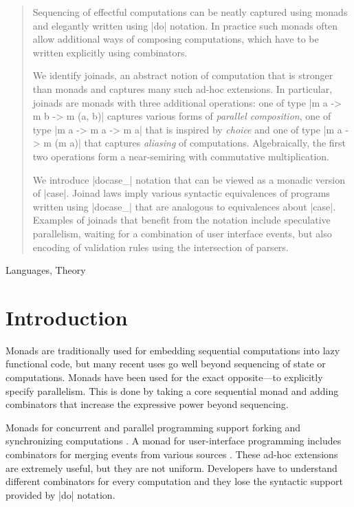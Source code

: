 \documentclass{sigplanconf}
\begin{document}
\begin{abstract}
Sequencing of effectful computations can be neatly captured using monads and elegantly written using 
|do| notation. In practice such monads often allow additional ways of composing computations, 
which have to be written explicitly using combinators.

We identify joinads, an abstract notion of computation that is stronger than monads and captures
many such ad-hoc extensions. In particular, joinads are monads with three additional operations: 
one of type |m a -> m b -> m (a, b)| captures various forms of \textit{parallel composition}, 
one of type |m a -> m a -> m a| that is inspired by \textit{choice} and one of type |m a -> m (m a)| 
that captures \textit{aliasing} of computations. Algebraically, the first two operations form a 
near-semiring with commutative multiplication.

We introduce |docase_| notation that can be viewed as a monadic version of |case|. Joinad laws
imply various syntactic equivalences of programs written using |docase_| 
that are analogous to equivalences about |case|. Examples of joinads that benefit from the notation
include speculative parallelism, waiting for a combination of user interface events, but also 
encoding of validation rules using the intersection of parsers. 
\end{abstract}


\terms
Languages, Theory



\section{Introduction}
Monads are traditionally used for embedding sequential computations into lazy functional code, 
but many recent uses go well beyond sequencing of state or computations. Monads have been used for 
the exact opposite---to explicitly specify parallelism. This is done by taking a core sequential 
monad and adding combinators that increase the expressive power beyond sequencing.

Monads for concurrent \cite{poorman} and parallel programming \cite{parmonad} support forking 
and synchronizing computations \cite{chp-monad}. A monad for user-interface programming 
includes combinators for merging events from various sources \cite{imperative-streams}. These 
ad-hoc extensions are extremely useful, but they are not uniform. Developers have to understand 
different combinators for every computation and they lose the syntactic support provided by |do| notation.
\end{document}

